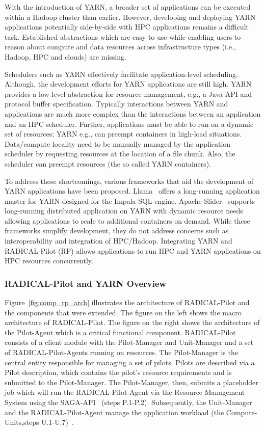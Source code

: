 With the introduction of YARN, a broader set of applications can be executed within a Hadoop cluster than earlier.
However, developing and deploying YARN applications potentially side-by-side with HPC applications remains a difficult task.
Established abstractions which are easy to use while enabling users to reason about compute and data resources across infrastructure types (i.e., Hadoop, HPC and clouds) are missing. 

Schedulers such as YARN effectively facilitate application-level scheduling.
Although, the development efforts for YARN applications are still high.
YARN provides a low-level abstraction for resource management, e.g., a Java API and protocol buffer specification.
Typically interactions between YARN and applications are much more complex than the interactions between an application and an HPC scheduler.
Further, applications must be able to run on a dynamic set of resources; YARN e.g., can preempt containers in high-load situations.
Data/compute locality need to be manually managed by the application scheduler by requesting resources at the location of a file chunk.
Also, the scheduler can preempt resources (the so called YARN containers).

To address these shortcomings, various frameworks that aid the development of YARN applications have been proposed.
Llama~\cite{llama} offers a long-running application master for YARN designed for the Impala SQL engine.
Apache Slider~\cite{apache-slider} supports long-running distributed application on YARN with dynamic resource needs allowing applications to scale to additional containers on demand.
While these frameworks simplify development, they do not address concerns such as interoperability and integration of HPC/Hadoop.
Integrating YARN and RADICAL-Pilot (RP) allows applications to run HPC and YARN applications on HPC resources concurrently.

\subsubsection*{RADICAL-Pilot and YARN Overview}
\label{sssec:rp_yarn}
Figure~\ref{fig:comp_rp_arch} illustrates the architecture of RADICAL-Pilot and the components that were extended.
The figure on the left shows the macro architecture of RADICAL-Pilot.
The figure on the right shows the architecture of the Pilot-Agent which is a critical functional component.
RADICAL-Pilot consists of a client module with the Pilot-Manager and Unit-Manager and a set of RADICAL-Pilot-Agents running on resources.
The Pilot-Manager is the central entity responsible for managing a set of pilots.
Pilots are described via a Pilot description, which contains the pilot's resource requirements and is submitted to the Pilot-Manager.
The Pilot-Manager, then, submits a placeholder job which will run the RADICAL-Pilot-Agent via the Resource Management System using the SAGA-API~\cite{merzky2015saga} (steps P.1-P.2).
Subsequently, the Unit-Manager and the RADICAL-Pilot-Agent manage the application workload (the Compute-Units,steps U.1-U.7)~\cite{merzky2019using}.

